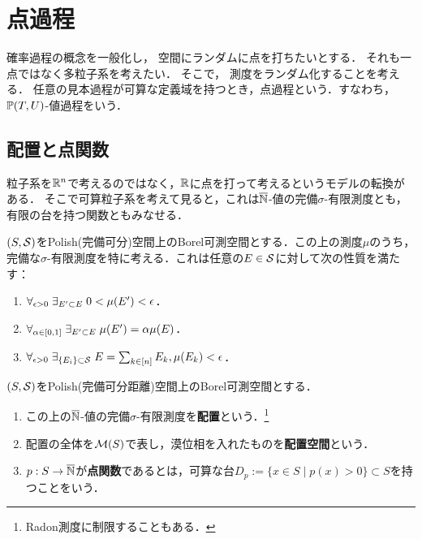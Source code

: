 \documentclass[uplatex,dvipdfmx]{jsreport}
\begin{document}
\section{点過程}

\begin{tcolorbox}[colframe=ForestGreen, colback=ForestGreen!10!white,breakable,colbacktitle=ForestGreen!40!white,coltitle=black,fonttitle=\bfseries\sffamily,
title=]
    確率過程の概念を一般化し，
    空間にランダムに点を打ちたいとする．
    それも一点ではなく多粒子系を考えたい．
    そこで，
    測度をランダム化することを考える．
    任意の見本過程が可算な定義域を持つとき，点過程という．すなわち，$\bP(T,U)$-値過程をいう．
\end{tcolorbox}

\subsection{配置と点関数}

\begin{tcolorbox}[colframe=ForestGreen, colback=ForestGreen!10!white,breakable,colbacktitle=ForestGreen!40!white,coltitle=black,fonttitle=\bfseries\sffamily,
title=]
    粒子系を$\R^n$で考えるのではなく，$\R$に点を打って考えるというモデルの転換がある．
    そこで可算粒子系を考えて見ると，これは$\o{\N}$-値の完備$\sigma$-有限測度とも，有限の台を持つ関数ともみなせる．
\end{tcolorbox}

\begin{lemma}
    $(S,\S)$をPolish(完備可分)空間上のBorel可測空間とする．この上の測度$\mu$のうち，
    完備な$\sigma$-有限測度を特に考える．これは任意の$E\in\S$に対して次の性質を満たす：
    \begin{enumerate}
        \item $\forall_{\ep>0}\;\exists_{E'\subset E}\;0<\mu(E')<\ep$．
        \item $\forall_{\al\in[0,1]}\;\exists_{E'\subset E}\;\mu(E')=\al\mu(E)$．
        \item $\forall_{\ep>0}\;\exists_{\{E_i\}\subset\S}\;E=\sum_{k\in[n]}E_k,\mu(E_k)<\ep$．
    \end{enumerate}
\end{lemma}

\begin{definition}
    $(S,\S)$をPolish(完備可分距離)空間上のBorel可測空間とする．
    \begin{enumerate}
        \item この上の$\o{\N}$-値の完備$\sigma$-有限測度を\textbf{配置}という．\footnote{Radon測度に制限することもある．}
        \item 配置の全体を$\M(S)$で表し，漠位相を入れたものを\textbf{配置空間}という．
        \item $p:S\to\o{\N}$が\textbf{点関数}であるとは，可算な台$D_p:=\{x\in S\mid p(x)>0\}\subset S$を持つことをいう．
    \end{enumerate}
\end{definition}
\end{document}
